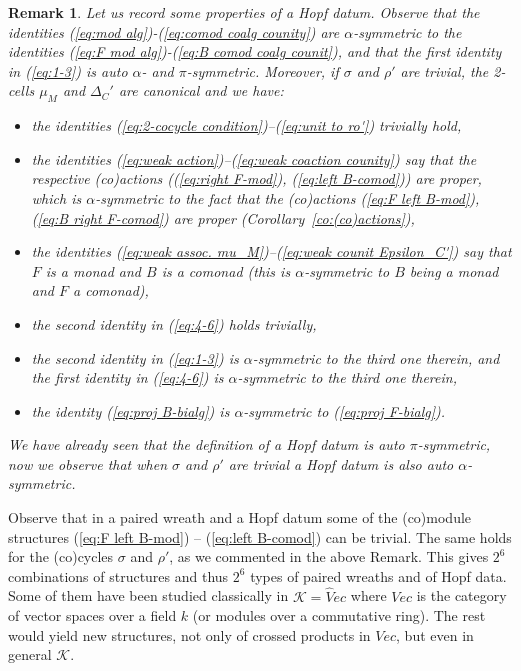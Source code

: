 \documentclass[a4paper, 12pt]{article}
\renewcommand{\_}[1]{\mbox{$_{\left( #1 \right)}$}}
\theoremstyle{plain}
\newtheorem{rem}[thm]{Remark}
\def\K{{\mathcal K}}  %
\newcommand{\equref}[1]{(\ref{eq:#1})}
\newcommand{\coref}[1]{Corollary~\ref{co:#1}}
\newcommand{\rmlabel}[1]{\label{rm:#1}}
\begin{document}
\begin{rem} \rmlabel{when cocycles are trivial}
Let us record some properties of a Hopf datum. 
Observe that the identities \equref{mod alg}-\equref{comod coalg counity} are $\alpha$-symmetric to the identities \equref{F mod alg}-\equref{B comod coalg counit}, and 
that the first identity in \equref{1-3} is auto $\alpha$- and $\pi$-symmetric. Moreover, if $\sigma$ and $\rho'$ are trivial, the 2-cells $\mu_M$ and $\Delta_C'$ are canonical 
and we have: 
\begin{itemize}
\item the identities \equref{2-cocycle condition}--\equref{unit to ro'} trivially hold, 
\item the identities \equref{weak action}--\equref{weak coaction counity} say that the respective (co)actions (\equref{right F-mod}, \equref{left B-comod}) are proper,  
which is $\alpha$-symmetric to the fact that the (co)actions \equref{F left B-mod}, \equref{B right F-comod} are proper (\coref{(co)actions}),
\item the identities \equref{weak assoc. mu_M}--\equref{weak counit Epsilon_C'} say that $F$ is a monad and $B$ is a comonad 
(this is $\alpha$-symmetric to $B$ being a monad and $F$ a comonad),
\item the second identity in \equref{4-6} holds trivially, 
\item the second identity in \equref{1-3} is $\alpha$-symmetric to the third one therein, 
and the first identity in \equref{4-6} is $\alpha$-symmetric to the third one therein, 
\item the identity \equref{proj B-bialg} is $\alpha$-symmetric to \equref{proj F-bialg}.
\end{itemize}
We have already seen that the definition of a Hopf datum is auto $\pi$-symmetric, now we observe that when $\sigma$ and $\rho'$ are trivial 
a Hopf datum is also auto $\alpha$-symmetric. %
\end{rem}


\medskip

Observe that in a paired wreath and a Hopf datum some of the (co)module structures \equref{F left B-mod} -- \equref{left B-comod} can be trivial. 
The same holds for the (co)cycles $\sigma$ and $\rho'$, as we commented in the above Remark. This gives $2^6$ combinations of structures and thus $2^6$ 
types of paired wreaths and of Hopf data. Some of them have been studied classically in $\K=\hat Vec$ where $Vec$ is the category of vector spaces over a field $k$ (or modules over a commutative ring). 
The rest would yield new structures, not only of crossed products in $Vec$, but even in general $\K$. 
\end{document}
